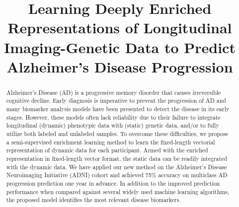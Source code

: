 \documentclass[runningheads]{llncs}
\begin{document}
%
\title{Learning Deeply Enriched Representations of Longitudinal Imaging-Genetic Data to Predict Alzheimer's Disease Progression}
\author{}
\institute{}

%
%
%
\maketitle              %
%
\begin{abstract}
Alzheimer’s Disease (AD) is a progressive memory disorder that causes irreversible cognitive decline. Early diagnosis is imperative to prevent the progression of AD and many biomarker analysis models have been presented to detect the disease in its early stages. However, these models often lack reliability due to their failure to integrate longitudinal (dynamic) phenotypic data with (static) genetic data, and/or to fully utilize both labeled and unlabeled samples.
To overcome these difficulties, we propose a semi-supervised enrichment learning method to learn the fixed-length vectorial representation of dynamic data for each participant. 
Armed with the enriched representation in fixed-length vector format, the static data can be readily integrated with the dynamic data.
We have applied our new method on the Alzheimer's Disease Neuroimaging Initiative (ADNI) cohort and achieved 75\% accuracy on multiclass AD progression prediction one year in advance. In addition to the improved prediction performance when compared against several widely used machine learning algorithms, the proposed model identifies the most relevant disease biomarkers.

\end{abstract}
\end{document}
